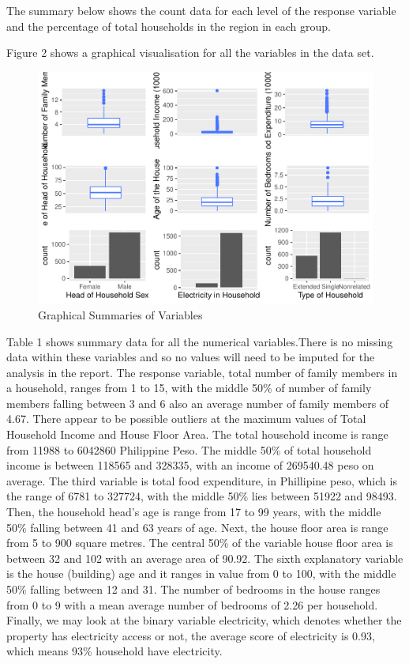 \documentclass[
]{article}
\begin{document}
The summary below shows the count data for each level of the response
variable and the percentage of total households in the region in each
group.

Figure 2 shows a graphical visualisation for all the variables in the
data set.

\begin{figure}[H]

{\centering \includegraphics[width=0.8\linewidth]{Group_01_files/figure-latex/all summaries-1} 

}

\caption{Graphical Summaries of Variables}\label{fig:all summaries}
\end{figure}

Table 1 shows summary data for all the numerical variables.There is no
missing data within these variables and so no values will need to be
imputed for the analysis in the report. The response variable, total
number of family members in a household, ranges from 1 to 15, with the
middle 50\% of number of family members falling between 3 and 6 also an
average number of family members of 4.67. There appear to be possible
outliers at the maximum values of Total Household Income and House Floor
Area. The total household income is range from 11988 to 6042860
Philippine Peso. The middle 50\% of total household income is between
118565 and 328335, with an income of 269540.48 peso on average. The
third variable is total food expenditure, in Phillipine peso, which is
the range of 6781 to 327724, with the middle 50\% lies between 51922 and
98493. Then, the household head's age is range from 17 to 99 years, with
the middle 50\% falling between 41 and 63 years of age. Next, the house
floor area is range from 5 to 900 square metres. The central 50\% of the
variable house floor area is between 32 and 102 with an average area of
90.92. The sixth explanatory variable is the house (building) age and it
ranges in value from 0 to 100, with the middle 50\% falling between 12
and 31. The number of bedrooms in the house ranges from 0 to 9 with a
mean average number of bedrooms of 2.26 per household. Finally, we may
look at the binary variable electricity, which denotes whether the
property has electricity access or not, the average score of electricity
is 0.93, which means 93\% household have electricity.
\end{document}
